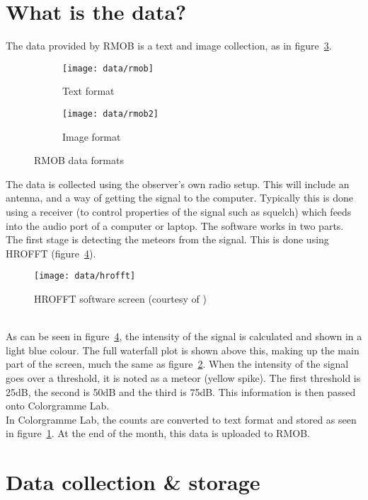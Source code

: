 \section{What is the data?}
The data provided by RMOB is a text and image collection, as in figure~\ref{fig:data:rmob}.\\
\begin{figure}[h!]
	\centering
	\begin{subfigure}{0.475\textwidth}
		\centering
		\texttt{[image: data/rmob]}
		\caption{Text format}
		\label{fig:data:rmob:a}
	\end{subfigure}
	\centering
	\begin{subfigure}{0.475\textwidth}
		\centering
		\texttt{[image: data/rmob2]}
		\caption{Image format}
		\label{fig:data:rmob:b}
	\end{subfigure}
	\caption{RMOB data formats
		\label{fig:data:rmob}}
\end{figure}
The data is collected using the observer's own radio setup. This will include an antenna, and a way of getting the signal to the computer. Typically this is done using a receiver (to control properties of the signal such as squelch) which feeds into the audio port of a computer or laptop. The software works in two parts. \\
The first stage is detecting the meteors from the signal. This is done using HROFFT \cite{hrofft} (figure~\ref{fig:data:hrofft}). 
\begin{figure}[h!]
	\centering
	\texttt{[image: data/hrofft]}
	\caption{HROFFT software screen (courtesy of \cite{hrofftimg})
		\label{fig:data:hrofft}}
\end{figure}\\
As can be seen in figure~\ref{fig:data:hrofft}, the intensity of the signal is calculated and shown in a light blue colour. The full waterfall plot is shown above this, making up the main part of the screen, much the same as figure~\ref{fig:data:rmob:b}. When the intensity of the signal goes over a threshold, it is noted as a meteor (yellow spike). The first threshold is 25dB, the second is 50dB and the third is 75dB. This information is then passed onto Colorgramme Lab. \\
In Colorgramme Lab, the counts are converted to text format and stored as seen in figure~\ref{fig:data:rmob:a}. At the end of the month, this data is uploaded to RMOB.

\section{Data collection \& storage}
